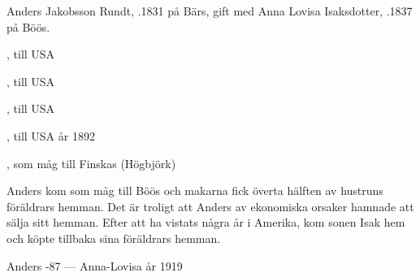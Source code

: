 %
Anders Jakobsson Rundt, .1831 på Bärs, gift med Anna Lovisa Isaksdotter, .1837 på Böös.
\begin{jhchildren}
  \item {}
  \item {}, till USA
  \item {}
  \item {}, till USA
  \item {}, till USA
  \item {}
  \item {}, till USA år 1892
  \item {}, som måg till Finskas (Högbjörk)
  \item {}
\end{jhchildren}
Anders kom som måg till Böös och makarna fick överta hälften av hustruns föräldrars hemman. Det  är troligt att Anders av ekonomiska orsaker hamnade att sälja sitt hemman. Efter att ha vistats några år i Amerika, kom sonen Isak hem och köpte tillbaka sina föräldrars hemman.

Anders -87  ---  Anna-Lovisa \textdied år 1919


